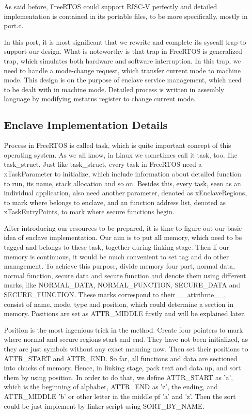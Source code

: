 \documentclass[conference]{IEEEtran}
\begin{document}
As said before, FreeRTOS could support RISC-V perfectly and detailed implementation is contained in its portable files, to be more specifically, mostly in port.c.  

In this port, it is most significant that we rewrite and complete its syscall trap to support our design. What is noteworthy is that trap in FreeRTOS is generalized trap, which simulates both hardware and software interruption. In this trap, we need to handle a mode-change request, which transfer current mode to machine mode. This design is on the purpose of enclave service management, which need to be dealt with in machine mode. Detailed process is written in assembly language by modifying mstatus register to change current mode.

\subsection{Enclave Implementation Details}

Process in FreeRTOS  is called task, which is quite important concept of this operating system. As we all know, in Linux we sometimes call it task, too, like task\_struct. Just like task\_struct, every task in FreeRTOS need a xTaskParameter to initialize, which include information about detailed function to run, its name, stack allocation and so on. Besides this, every task, seen as an individual application, also need another parameter, denoted as xEnclaveRegions, to mark where belongs to enclave, and an function address list, denoted as xTaskEntryPoints, to mark where secure functions begin.

After introducing our resources to be prepared, it is time to figure out our basic idea of enclave implementation. Our aim is to put all memory, which need to be tagged and belongs to these task, together during linking stage. Then if our memory is continuous, it would be much convenient to set tag and do other management. To achieve this purpose, divide memory four part, normal data, normal function, secure data and secure function and denote them using different marks, like NORMAL\_DATA, NORMAL\_FUNCTION, SECURE\_DATA and SECURE\_FUNCTION. These marks correspond to their \_\_attribute\_\_, consist of name, mode, type and position, which could determine a section in memory. Positions are set as ATTR\_MIDDLE firstly and will be explained later.

Position is the most ingenious trick in the method. Create four pointers to mark where normal and secure regions start and end. They have not been initialized, as they are just symbols without any exact meaning now. Then set their positions to ATTR\_START and ATTR\_END. So far, all functions and data are sectioned into chucks of memory.  Hence, in linking stage, pack text and data up, and sort them by using position. In order to do that, we define ATTR\_START as 'a', which is the beginning of alphabet, ATTR\_END as 'z', the ending, and ATTR\_MIDDLE 'b' or other letter in the middle pf 'a' and 'z'. Then the sort could be just implement by linker script using SORT\_BY\_NAME.
\end{document}
